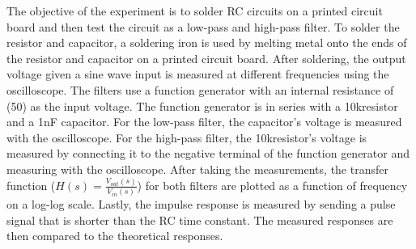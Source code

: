 \documentclass[a4paper,10pt]{article}
\begin{document}
The objective of the experiment is to solder RC circuits on a printed circuit board and then test the circuit as a low-pass and high-pass filter. To solder the resistor and capacitor, a soldering iron is used by melting metal onto the ends of the resistor and capacitor on a printed circuit board. After soldering, the output voltage given a sine wave input is measured at different frequencies using the oscilloscope. The filters use a function generator with an internal resistance of (50\textOmega) as the input voltage. The function generator is in series with a 10k\textOmega resistor and a 1nF capacitor. For the low-pass filter, the capacitor's voltage is measured with the oscilloscope. For the high-pass filter, the 10k\textOmega resistor's voltage is measured by connecting it to the negative terminal of the function generator and measuring with the oscilloscope. After taking the measurements, the transfer function ($H(s) = \frac{V_{out}(s)}{V_{in}(s)}$) for both filters are plotted as a function of frequency on a log-log scale. Lastly, the impulse response is measured by sending a pulse signal that is shorter than the RC time constant. The measured responses are then compared to the theoretical responses. \\
\end{document}
